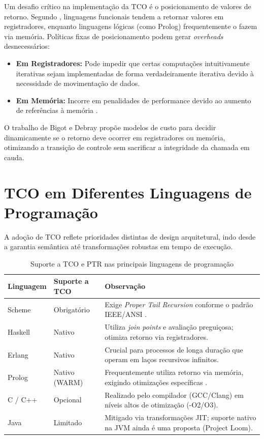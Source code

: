 \documentclass[12pt, a4paper]{article}
\begin{document}
Um desafio crítico na implementação da TCO é o posicionamento de valores de retorno. Segundo \autocite{bigot1999}, linguagens funcionais tendem a retornar valores em registradores, enquanto linguagens lógicas (como Prolog) frequentemente o fazem via memória. Políticas fixas de posicionamento podem gerar \textit{overheads} desnecessários:
\begin{itemize}
    \item \textbf{Em Registradores:} Pode impedir que certas computações intuitivamente iterativas sejam implementadas de forma verdadeiramente iterativa devido à necessidade de movimentação de dados.
    \item \textbf{Em Memória:} Incorre em penalidades de performance devido ao aumento de referências à memória \autocite{bigot1999}.
\end{itemize}

O trabalho de Bigot e Debray propõe modelos de custo para decidir dinamicamente se o retorno deve ocorrer em registradores ou memória, otimizando a transição de controle sem sacrificar a integridade da chamada em cauda.

\section{TCO em Diferentes Linguagens de Programação}

A adoção de TCO reflete prioridades distintas de design arquitetural, indo desde a garantia semântica até transformações robustas em tempo de execução.

\begin{table}[H]
  \centering
  \caption{Suporte a TCO e PTR nas principais linguagens de programação}
  \label{tab:tco_linguagens}
  \begin{tabularx}{\textwidth}{llX}
    \toprule
    \textbf{Linguagem} & \textbf{Suporte a TCO} & \textbf{Observação} \\
    \midrule
    Scheme   & Obrigatório & Exige \textit{Proper Tail Recursion} conforme o padrão IEEE/ANSI \autocite{clinger1998}. \\
    Haskell  & Nativo      & Utiliza \textit{join points} e avaliação preguiçosa; otimiza retorno via registradores. \\
    Erlang   & Nativo      & Crucial para processos de longa duração que operam em laços recursivos infinitos. \\
    Prolog   & Nativo (WARM) & Frequentemente utiliza retorno via memória, exigindo otimizações específicas \autocite{bigot1999}. \\
    C / C++ & Opcional     & Realizado pelo compilador (GCC/Clang) em níveis altos de otimização (-O2/O3). \\
    Java     & Limitado     & Mitigado via transformações JIT; suporte nativo na JVM ainda é uma proposta (Project Loom). \\
    \bottomrule
  \end{tabularx}
\end{table}
\end{document}
